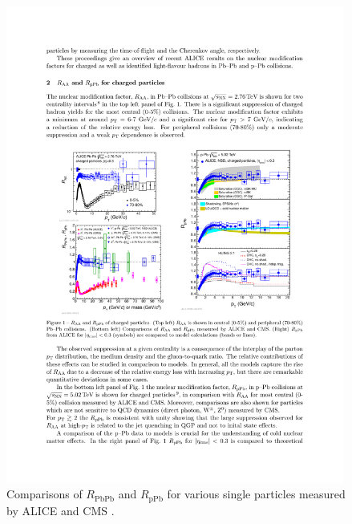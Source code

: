   \begin{figure}[htpb]
    \centering
    \includegraphics[width=0.99\textwidth]{Introduction/alice_hadron_raa.pdf}
    \caption{Comparisons of $R_\mathrm{PbPb}$ and $R_\mathrm{pPb}$ for various single particles measured by ALICE and CMS \cite{Bencedi2016}.}
    \label{fig:raa_particles}
  \end{figure}

